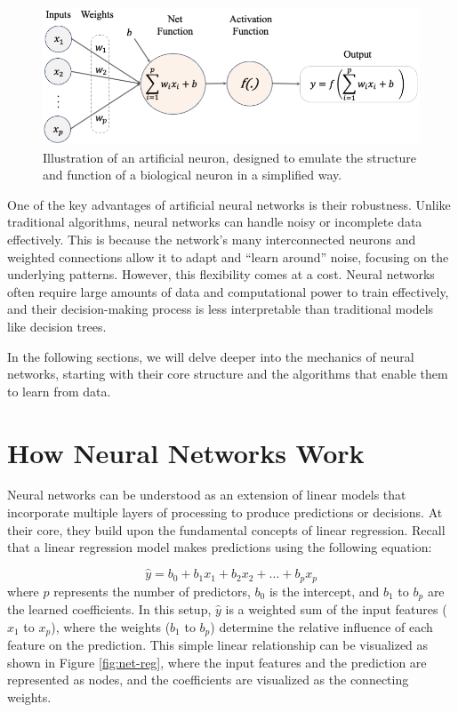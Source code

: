 \documentclass[
]{book}
\theoremstyle{definition}
\theoremstyle{definition}
\theoremstyle{definition}
\theoremstyle{definition}
\theoremstyle{remark}
\begin{document}
\begin{figure}

{\centering \includegraphics[width=0.9\linewidth]{images/net_1} 

}

\caption{Illustration of an artificial neuron, designed to emulate the structure and function of a biological neuron in a simplified way.}\label{fig:net-1}
\end{figure}

One of the key advantages of artificial neural networks is their robustness. Unlike traditional algorithms, neural networks can handle noisy or incomplete data effectively. This is because the network's many interconnected neurons and weighted connections allow it to adapt and ``learn around'' noise, focusing on the underlying patterns. However, this flexibility comes at a cost. Neural networks often require large amounts of data and computational power to train effectively, and their decision-making process is less interpretable than traditional models like decision trees.

In the following sections, we will delve deeper into the mechanics of neural networks, starting with their core structure and the algorithms that enable them to learn from data.

\section{How Neural Networks Work}\label{how-neural-networks-work}

Neural networks can be understood as an extension of linear models that incorporate multiple layers of processing to produce predictions or decisions. At their core, they build upon the fundamental concepts of linear regression. Recall that a linear regression model makes predictions using the following equation:

\[
\hat{y} = b_0 + b_1 x_1 + b_2 x_2 + \dots + b_p x_p
\]
where \(p\) represents the number of predictors, \(b_0\) is the intercept, and \(b_1\) to \(b_p\) are the learned coefficients. In this setup, \(\hat{y}\) is a weighted sum of the input features (\(x_1\) to \(x_p\)), where the weights (\(b_1\) to \(b_p\)) determine the relative influence of each feature on the prediction. This simple linear relationship can be visualized as shown in Figure \ref{fig:net-reg}, where the input features and the prediction are represented as nodes, and the coefficients are visualized as the connecting weights.
\end{document}
